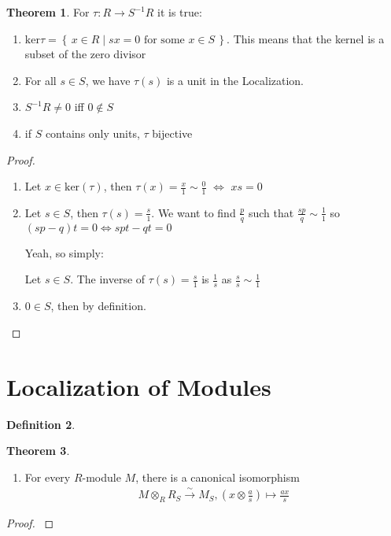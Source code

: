 \documentclass[a4paper]{book}
\theoremstyle{definition}
\newtheorem{definition}{Definition}[]
\newtheorem{theorem}[definition]{Theorem}
\newcommand{\makeset}[2]{\left\{\, #1 \mid #2 \,\right\}}
\begin{document}
\begin{thmbox}
    \begin{theorem}
        For \(\tau: R \longrightarrow S^{-1}R\) it is true:
        \begin{enumerate}
            \item \(\text{ker}\tau = \makeset{x \in R}{sx = 0 \text{ for some } x \in S}\). This means that the kernel is a subset of the zero divisor
            \item For all \(s \in S\), we have \(\tau(s)\) is a unit in the Localization.
            \item \(S^{-1}R \neq 0\) iff \(0 \not\in S\)
            \item if \(S\) contains only units, \(\tau\) bijective
        \end{enumerate}
    \end{theorem}
\end{thmbox}
\begin{proof}
    \begin{enumerate}
        \item Let \(x \in \text{ker}(\tau)\), then \(\tau(x) = \frac{x}{1} \sim \frac{0}{1}\) \(\iff\) \(xs = 0\)
        \item Let \(s \in S\), then \(\tau(s) = \frac{s}{1}\). We want to find \(\frac{p}{q}\) such that \(\frac{sp}{q} \sim \frac{1}{1}\) so \((sp - q)t = 0 \iff spt - qt = 0\)
        
        Yeah, so simply:

        Let \(s \in S\). The inverse of \(\tau(s) = \frac{s}{1}\) is \(\frac{1}{s}\) as \(\frac{s}{s} \sim \frac{1}{1}\)

        \item \(0 \in S\), then by definition.
    \end{enumerate}
\end{proof}

\newpage
\section{Localization of Modules}
\begin{defbox}
    \begin{definition}
        
    \end{definition}
\end{defbox}

\begin{thmbox}
    \begin{theorem}
        \begin{enumerate}
            \item For every \(R\)-module \(M\), there is a canonical isomorphism
            \begin{align*}
                M \otimes_R R_S \overset{\sim}{\longrightarrow} M_S, (x \otimes \frac{a}{s}) \mapsto \frac{ax}{s}
            \end{align*}
        \end{enumerate}
    \end{theorem}
\end{thmbox}
\begin{proof}
    \textbf{}
\end{proof}
\end{document}
